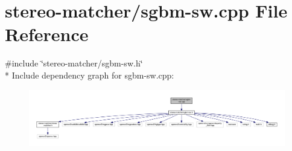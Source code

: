 \hypertarget{sgbm-sw_8cpp}{}\section{stereo-\/matcher/sgbm-\/sw.cpp File Reference}
\label{sgbm-sw_8cpp}
{\ttfamily \#include \char`\"{}stereo-\/matcher/sgbm-\/sw.\+h\char`\"{}}\\*
Include dependency graph for sgbm-\/sw.cpp\+:
\nopagebreak
\begin{figure}[H]
\begin{center}
\leavevmode
\includegraphics[width=350pt]{sgbm-sw_8cpp__incl}
\end{center}
\end{figure}
